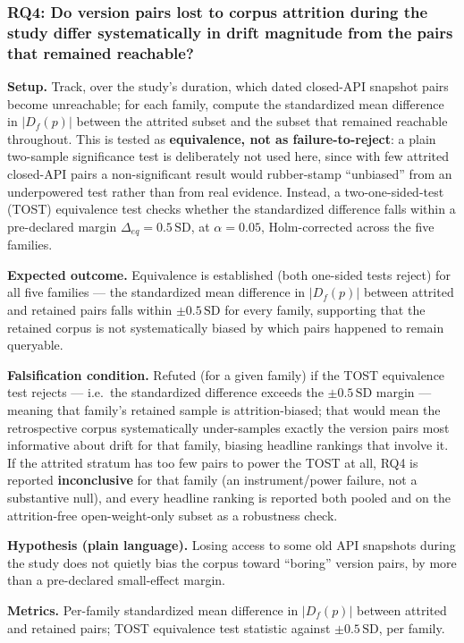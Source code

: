 \documentclass[11pt]{article}
\begin{document}
\subsubsection{RQ4: Do version pairs lost to corpus attrition during the study differ systematically in drift magnitude from the pairs that remained reachable?}
\textbf{Setup.} Track, over the study's duration, which dated closed-API snapshot pairs become unreachable; for each family, compute the standardized mean difference in $|D_f(p)|$ between the attrited subset and the subset that remained reachable throughout. This is tested as \textbf{equivalence, not as failure-to-reject}: a plain two-sample significance test is deliberately not used here, since with few attrited closed-API pairs a non-significant result would rubber-stamp ``unbiased'' from an underpowered test rather than from real evidence. Instead, a two-one-sided-test (TOST) equivalence test checks whether the standardized difference falls within a pre-declared margin $\Delta_{eq} = 0.5\,\text{SD}$, at $\alpha=0.05$, Holm-corrected across the five families.

\textbf{Expected outcome.} Equivalence is established (both one-sided tests reject) for all five families --- the standardized mean difference in $|D_f(p)|$ between attrited and retained pairs falls within $\pm 0.5\,\text{SD}$ for every family, supporting that the retained corpus is not systematically biased by which pairs happened to remain queryable.

\textbf{Falsification condition.} Refuted (for a given family) if the TOST equivalence test rejects --- i.e.\ the standardized difference exceeds the $\pm 0.5\,\text{SD}$ margin --- meaning that family's retained sample is attrition-biased; that would mean the retrospective corpus systematically under-samples exactly the version pairs most informative about drift for that family, biasing headline rankings that involve it. If the attrited stratum has too few pairs to power the TOST at all, RQ4 is reported \textbf{inconclusive} for that family (an instrument/power failure, not a substantive null), and every headline ranking is reported both pooled and on the attrition-free open-weight-only subset as a robustness check.

\textbf{Hypothesis (plain language).} Losing access to some old API snapshots during the study does not quietly bias the corpus toward ``boring'' version pairs, by more than a pre-declared small-effect margin.

\textbf{Metrics.} Per-family standardized mean difference in $|D_f(p)|$ between attrited and retained pairs; TOST equivalence test statistic against $\pm 0.5\,\text{SD}$, per family.
\end{document}

